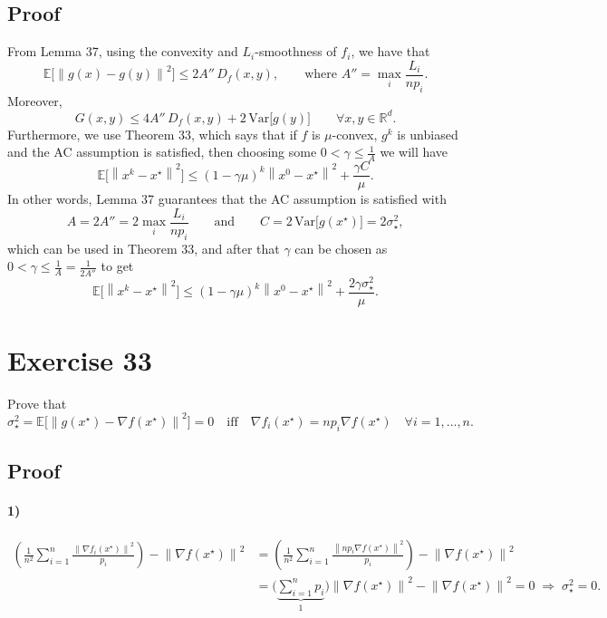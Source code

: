 \documentclass[11pt,a4paper]{article}
\newcommand{\R}{\mathbb{R}}
\newcommand{\E}{\mathbb{E}}
\newcommand{\norm}[1]{\left\| #1 \right\|}
\newcommand{\xs}{x^\star}
\begin{document}
\subsection*{Proof}
From Lemma 37, using the convexity and $L_i$-smoothness of $f_i$, we have that
\[
  \E\bigl[\norm{g(x) - g(y)}^2\bigr] \le 2A''\,D_f(x,y), \qquad \text{where } A'' = \max_i \frac{L_i}{np_i}.
\]
Moreover,
\[
  G(x,y) \le 4A''\,D_f(x,y) + 2\,\mathrm{Var}\bigl[g(y)\bigr] \qquad \forall x, y \in \R^d .
\]
Furthermore, we use Theorem 33, which says that if $f$ is $\mu$-convex, $g^k$ is unbiased and the AC
assumption is satisfied, then choosing some $0 < \gamma \le \frac{1}{A}$ we will have
\[
  \E\bigl[\norm{x^k - \xs}^2\bigr] \le (1-\gamma\mu)^k\norm{x^0 - \xs}^2 + \frac{\gamma C}{\mu}.
\]
In other words, Lemma 37 guarantees that the AC assumption is satisfied with
\[
  A = 2A'' = 2\max_i \frac{L_i}{np_i} \qquad \text{and} \qquad C = 2\,\mathrm{Var}\bigl[g(\xs)\bigr] = 2\sigma_\star^2,
\]
which can be used in Theorem 33, and after that $\gamma$ can be chosen as
$0 < \gamma \le \frac{1}{A} = \frac{1}{2A''}$ to get
\[
  \E\bigl[\norm{x^k - \xs}^2\bigr] \le (1-\gamma\mu)^k\norm{x^0 - \xs}^2 + \frac{2\gamma\sigma_\star^2}{\mu}.
\]

\section*{Exercise 33}

Prove that
\[
  \sigma_\star^2 = \E\bigl[\norm{g(\xs) - \nabla f(\xs)}^2\bigr] = 0
  \quad\text{iff}\quad \nabla f_i(\xs) = np_i\nabla f(\xs) \quad \forall i = 1,\dots,n.
\]

\subsection*{Proof}
\paragraph{1)}
\begin{align*}
  \left(\frac{1}{n^2}\sum_{i=1}^n \frac{\norm{\nabla f_i(\xs)}^2}{p_i}\right) - \norm{\nabla f(\xs)}^2
  &= \left(\frac{1}{n^2}\sum_{i=1}^n \frac{\norm{np_i\nabla f(\xs)}^2}{p_i}\right) - \norm{\nabla f(\xs)}^2 \\
  &= \Biggl(\underbrace{\sum_{i=1}^n p_i}_{1}\Biggr)\norm{\nabla f(\xs)}^2 - \norm{\nabla f(\xs)}^2 = 0
  \;\Rightarrow\; \sigma_\star^2 = 0 .
\end{align*}
\end{document}
